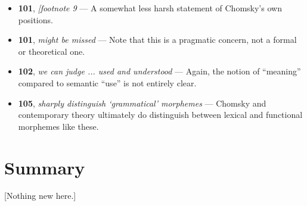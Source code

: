 \documentclass[12pt]{article}
\begin{document}
\begin{itemize}
\item \textbf{101}, \textit{[footnote 9} --- A somewhat less harsh statement of Chomsky's own positions.

\item \textbf{101}, \textit{might be missed} --- Note that this is a pragmatic concern, not a formal or theoretical one.

\item \textbf{102}, \textit{we can judge ... used and understood} --- Again, the notion of ``meaning'' compared to semantic ``use'' is not entirely clear.

\item \textbf{105}, \textit{sharply distinguish `grammatical' morphemes} --- Chomsky and contemporary theory ultimately do distinguish between lexical and functional morphemes like these.

\end{itemize}

\section{Summary}

[Nothing new here.]
\end{document}
